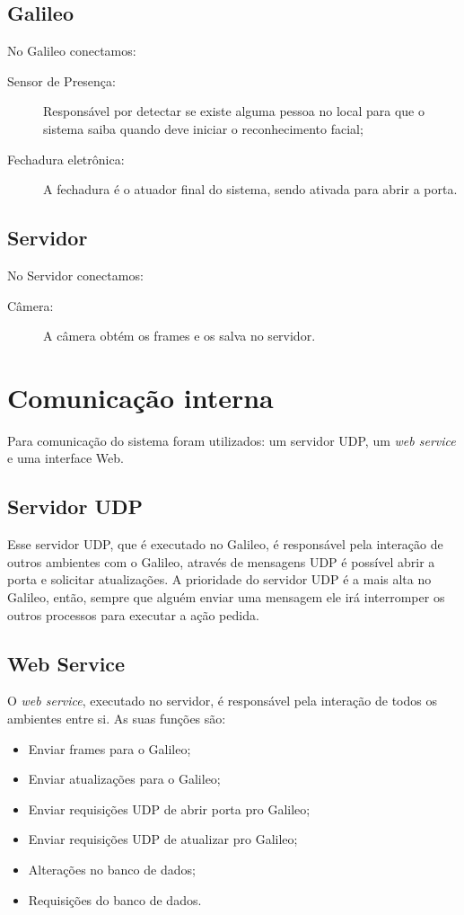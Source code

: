 \documentclass[12pt]{article}
\begin{document}

\subsection{Galileo}
    No Galileo conectamos:
    \begin{description}
        \item[Sensor de Presença:] Responsável por detectar se existe alguma
        pessoa no local para que o sistema saiba quando deve iniciar o
        reconhecimento facial;
        \item[Fechadura eletrônica:] A fechadura é o atuador final do sistema,
        sendo ativada para abrir a porta.
    \end{description}
\subsection{Servidor}
    No Servidor conectamos:
    \begin{description}
        \item[Câmera:] A câmera obtém os frames e os salva no servidor.
    \end{description}

\section{Comunicação interna}
    Para comunicação do sistema foram utilizados: um servidor UDP, um
    \textit{web service} e uma interface Web.
\subsection{Servidor UDP}
    Esse servidor UDP, que é executado no Galileo, é responsável pela interação
    de outros ambientes com o Galileo, através de mensagens UDP é possível abrir
    a porta e solicitar atualizações.
    A prioridade do servidor UDP é a mais alta no Galileo, então, sempre que
    alguém enviar uma mensagem ele irá interromper os outros processos para
    executar a ação pedida.
\subsection{Web Service}
    O \textit{web service}, executado no servidor, é responsável pela interação
    de todos os ambientes entre si. As suas funções são:
    \begin{itemize}
        \item Enviar frames para o Galileo;
        \item Enviar atualizações para o Galileo;
        \item Enviar requisições UDP de abrir porta pro Galileo;
        \item Enviar requisições UDP de atualizar pro Galileo;
        \item Alterações no banco de dados;
        \item Requisições do banco de dados.
    \end{itemize}
\end{document}
